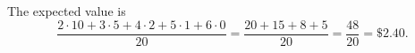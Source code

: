 The expected value is
\[
\dfrac{2\cdot10+3\cdot5+4\cdot2+5\cdot1+6\cdot0}{20}=\dfrac{20+15+8+5}{20}=\dfrac{48}{20}=\boxed{\$2.40}.
\]
